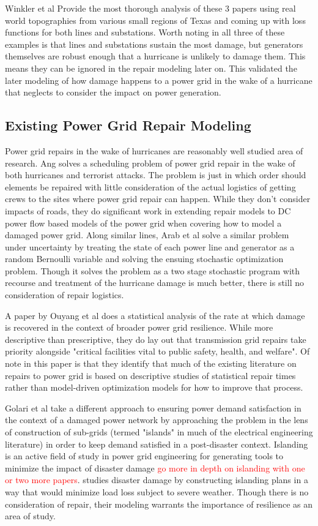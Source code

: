 \documentclass{article}
\begin{document}
		 Winkler et al \cite{WinklerEA2010} Provide the most thorough analysis of these 3 papers using real world topographies from various small regions of Texas and coming up with loss functions for both lines and substations. Worth noting in all three of these examples is that lines and substations sustain the most damage, but generators themselves are robust enough that a hurricane is unlikely to damage them. This means they can be ignored in the repair modeling later on. This validated the later modeling of how damage happens to a power grid in the wake of a hurricane that neglects to consider the impact on power generation.
	\subsection{Existing Power Grid Repair Modeling}
		Power grid repairs in the wake of hurricanes are reasonably well studied area of research. Ang \cite{NPSMasters} solves a scheduling problem of power grid repair in the wake of both hurricanes and terrorist attacks. The problem is just in which order should elements be repaired with little consideration of the actual logistics of getting crews to the sites where power grid repair can happen. While they don't consider impacts of roads, they do significant work in extending repair models to DC power flow based models of the power grid when covering how to model a damaged power grid. Along similar lines, Arab et al \cite{ArabEA2015} solve a similar problem under uncertainty by treating the state of each power line and generator as a random Bernoulli variable and solving the ensuing stochastic optimization problem. Though it solves the problem as a two stage stochastic program with recourse and treatment of the hurricane damage is much better, there is still no consideration of repair logistics. 
		
		A paper by Ouyang et al\cite{OuyangEA2014} does a statistical analysis of the rate at which damage is recovered in the context of broader power grid resilience. While more descriptive than prescriptive, they do lay out that transmission grid repairs take priority alongside "critical facilities vital to public safety, health, and welfare". Of note in this paper is that they identify that much of the existing literature on repairs to power grid is based on descriptive studies of statistical repair times rather than model-driven optimization models for how to improve that process.
		
		Golari et al\cite{GolariEA2014} take a different approach to ensuring power demand satisfaction in the context of a damaged power network by approaching the problem in the lens of construction of sub-grids (termed "islands" in much of the electrical engineering literature) in order to keep demand satisfied in a post-disaster context. Islanding is an active field of study in power grid engineering for generating tools to minimize the impact of disaster damage \textcolor{red}{go more in depth on islanding with one or two more papers}. \cite{Panteli2016} studies disaster damage by constructing islanding plans in a way that would minimize load loss subject to severe weather. Though there is no consideration of repair, their modeling warrants the importance of resilience as an area of study.  
\end{document}
